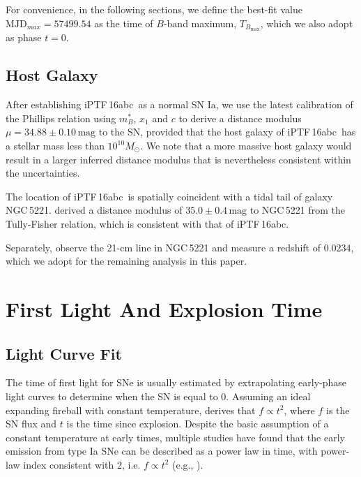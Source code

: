 \documentclass[twocolumn]{aastex61}
\newcommand{\sm}{M_\odot}
\newcommand{\abc}{iPTF\,16abc}
\begin{document}
For convenience, in the following sections, we define the best-fit
value $\textrm{MJD}_{max}=57499.54$ as the time of $B$-band maximum, $T_{B_\mathrm{max}}$, which we also adopt as phase $t=0$.

\subsection{Host Galaxy}
\label{sec:host}

After establishing \abc\ as a normal SN Ia, we use the latest
calibration \citep{2014A&A...568A..22B} of the Phillips relation
\citep{1993ApJ...413L.105P} using $m^*_{B}$, $x_1$ and $c$ to derive 
a distance modulus $\mu = 34.88 \pm 0.10 \,\textrm{mag}$ to the SN, 
provided that the host galaxy of \abc\ has a stellar mass less than
$10^{10}\sm$. We note that a more massive host galaxy would result 
in a larger inferred distance modulus that is nevertheless 
consistent within the uncertainties.

The location of \abc\ is spatially coincident with a tidal tail of
galaxy NGC\,5221. \citet{2007A&A...465...71T} derived a distance
modulus of $35.0\pm0.4\,\textrm{mag}$ to NGC\,5221 from the 
Tully-Fisher relation, which is consistent with that of \abc.

Separately, \citet{2015MNRAS.447.1531C} observe the 21-cm line in
NGC\,5221 and measure a redshift of $0.0234$, which we adopt for the remaining analysis in this paper.

\section{First Light And Explosion Time}
\label{sec:first_light}

\subsection{Light Curve Fit}
\label{sec:lc_fit}

The time of first light for SNe is usually estimated by 
extrapolating early-phase light curves to determine when the 
SN is equal to 0. Assuming an ideal expanding fireball with 
constant temperature, \citet{1982ApJ...253..785A} derives that $f 
\propto t^2$, where $f$ is the SN flux and $t$ is the time since 
explosion. Despite the basic assumption of a constant temperature at 
early times, multiple studies have found that the early emission 
from type Ia SNe can be described as a power law in time, with 
power-law index consistent with 2, i.e. $f \propto t^2$ (e.g., \citep{2006AJ....132.1707C, 2010ApJ...712..350H, 2011MNRAS.416.2607G}).
\end{document}
